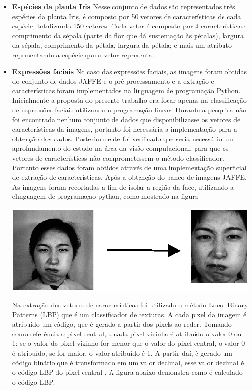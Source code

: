 \begin{itemize}
\item \textbf{Espécies da planta Iris \cite{Iris}}
Nesse conjunto de dados são representados três espécies da planta Iris, é composto por 50 vetores de características de cada espécie, totalizando 150 vetores. Cada vetor é composto por 4 características: comprimento da sépala (parte da flor que dá sustentação às pétalas), largura da sépala, comprimento da pétala, largura da pétala; e mais um atributo representando a espécie que o vetor representa.

\item \textbf{Expressões faciais}
No caso das expressões faciais, as imagens foram obtidas do conjunto de dados JAFFE \cite{Jaffe} e o pré processamento e a extração e características foram implementados na linguagem de programação Python.
Inicialmente a proposta do presente trabalho era focar apenas na classificação de expressões faciais utilizando a programação linear. Durante a pesquisa não foi encontrada nenhum conjunto de dados que disponibilizasse os vetores de características da imagens, portanto foi necessária a implementação para a obtenção dos dados. Posteriormente foi verificado que seria necessário um aprofundamento do estudo na área da visão computacional, para que os vetores de características não comprometessem o método classificador. Portanto esses dados foram obtidos através de uma implementação superficial de extração de características.
Após a obtenção do banco de imagens JAFFE. As imagens foram recortadas a fim de isolar a região da face, utilizando a elinguagem de programação python, como mostrado na figura

\begin{center}
	\includegraphics[scale=0.5]{graficos/jaffe}
	\label{img:jaffe}
\end{center}

Na extração dos vetores de características foi utilizado o método Local Binary Patterns (LBP) que é um classificador de texturas. A cada pixel da imagem é atribuído um código, que é gerado a partir dos pixels ao redor. Tomando como referência o pixel central, a cada pixel vizinho é atribuído o valor 0 ou 1: se o valor do pixel vizinho for menor que o valor do pixel central, o valor 0 é atribuído, se for maior, o valor atribuído é 1. A partir daí, é gerado um código binário que é transformado em um valor decimal, esse valor decimal é o código LBP do pixel central \cite{LBPShan2009}. A figura abaixo demonstra como é calculado o código LBP.


\end{itemize}
